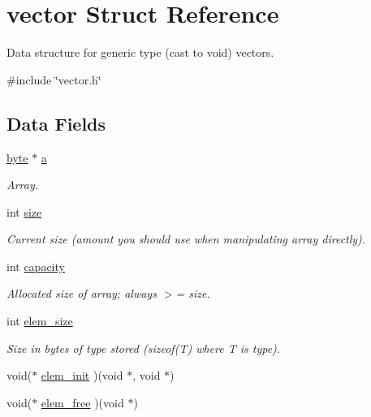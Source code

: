 \hypertarget{structvector}{
\section{vector Struct Reference}
\label{structvector}
}


Data structure for generic type (cast to void) vectors.  




{\ttfamily \#include \char`\"{}vector.h\char`\"{}}

\subsection*{Data Fields}
\begin{DoxyCompactItemize}
\item 
\hyperlink{vector_8h_a0c8186d9b9b7880309c27230bbb5e69d}{byte} $\ast$ \hyperlink{structvector_ae086a0bd5a910803add11ed953819018}{a}
\begin{DoxyCompactList}\small\item\em Array. \item\end{DoxyCompactList}\item 
int \hyperlink{structvector_a211c6f9096b87e1ff8b09ad5ad373e61}{size}
\begin{DoxyCompactList}\small\item\em Current size (amount you should use when manipulating array directly). \item\end{DoxyCompactList}\item 
int \hyperlink{structvector_a95bc684a8044cfc0e509861448908bf2}{capacity}
\begin{DoxyCompactList}\small\item\em Allocated size of array; always $>$= size. \item\end{DoxyCompactList}\item 
int \hyperlink{structvector_a1e2d06aaea690d5420fc153fa9b8c2b8}{elem\_\-size}
\begin{DoxyCompactList}\small\item\em Size in bytes of type stored (sizeof(T) where T is type). \item\end{DoxyCompactList}\item 
void($\ast$ \hyperlink{structvector_a9aa1b736be034d1734173299ba7874e2}{elem\_\-init} )(void $\ast$, void $\ast$)
\item 
void($\ast$ \hyperlink{structvector_aa707fd886c386fe365b6d6dbadb49733}{elem\_\-free} )(void $\ast$)
\end{DoxyCompactItemize}


